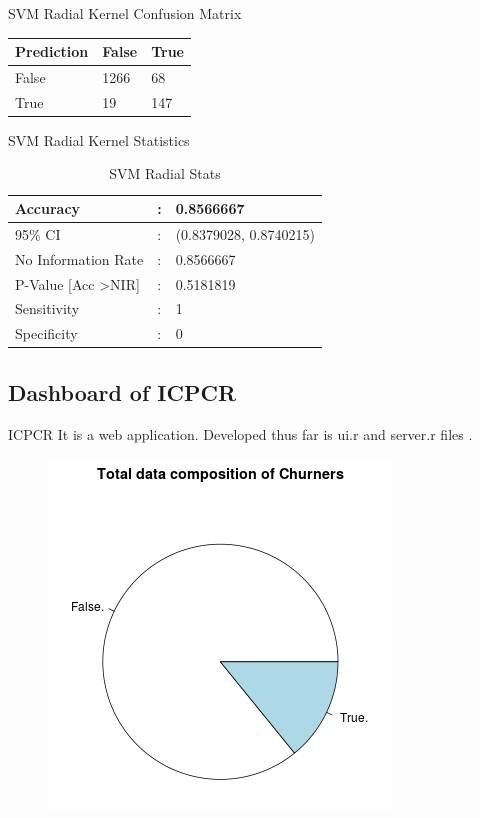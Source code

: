 \documentclass{beamer}
\begin{document}
\begin{frame}{SVM Radial Kernel Confusion Matrix}
	\begin{table}
		\begin{tabular}{lll}
			\hline
			Prediction & False & True \\
			\hline
			False & 1266 & 68 \\
			\hline
			True & 19 & 147 \\
			\hline
		\end{tabular}
	\end{table}
\end{frame}

\begin{frame}{SVM Radial Kernel Statistics}
	\begin{table}[]
		\centering
		\caption{SVM Radial Stats}
		\label{dt-1-stats}
		\begin{tabular}{p{5cm}p{1cm}p{5cm}}
			Accuracy  & : & 0.8566667 \\
			\hline
			95\% CI   & : & (0.8379028, 0.8740215) \\ \hline
			No Information Rate  & : & 0.8566667  \\ \hline
			P-Value {[}Acc \textgreater NIR{]}  & : &  0.5181819 \\ \hline
			Sensitivity  & : & 1 \\ \hline
			Specificity  & : & 0 \\ \hline
			
		\end{tabular}
	\end{table}
\end{frame}
\subsection{Dashboard of ICPCR}
\begin{frame}{ICPCR}
	It is a web application.
	Developed thus far is ui.r and server.r files .
	\begin{figure}
		\includegraphics[scale=0.5]{ppt_figures/web_dash_1}
	\end{figure}
\end{frame}
\end{document}
